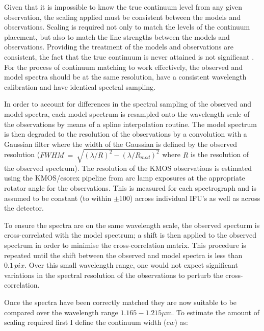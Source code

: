 \documentclass[12pt]{article}
\begin{document}
Given that it is impossible to know the true continuum level from any given observation,
the scaling applied must be consistent between the models and observations.
Scaling is required not only to match the levels of the continuum placement, but also to match the line strengths between the models and observations.
Providing the treatment of the models and observations are consistent, the fact that the true continuum is never attained is not significant
\citep{2014ApJ...788...58G}.
For the process of continuum matching to work effectively,
the observed and model spectra should be at the same resolution,
have a consistent wavelength calibration
and have identical spectral sampling.

In order to account for differences in the spectral sampling of the observed and model spectra,
each model spectrum is resampled onto the wavelength scale of the observations by means of a spline interpolation routine.
The model spectrum is then degraded to the resolution of the observations by a
convolution with a Gaussian filter where the width of the Gaussian is defined by the observed resolution ($FWHM~=~\sqrt{(\lambda/R)^{2} -(\lambda/R_{mod})^{2}}$ where $R$ is the resolution of the observed spectrum).
The resolution of the KMOS observations is estimated using the KMOS/esorex pipeline from arc lamp exposures at the appropriate rotator angle for the observations.
This is measured for each spectrograph and is assumed to be constant (to within $\pm 100$) across individual IFU's as well as across the detector.

To ensure the spectra are on the same wavelength scale, the observed specturm is cross-correlated with the model spectrum;
a shift is then applied to the observed spectrum in order to minimise the cross-correlation matrix.
This procedure is repeated until the shift between the observed and model spectra is less than $0.1\,pix$.
Over this small wavelength range, one would not expect significant variations in the spectral resolution of the observations to perturb the cross-correlation.

Once the spectra have been correctly matched they are now suitable to be compared over the wavelength range $1.165-1.215\mu$m.
To estimate the amount of scaling required first I define the continuum width ($cw$) as:
\end{document}
